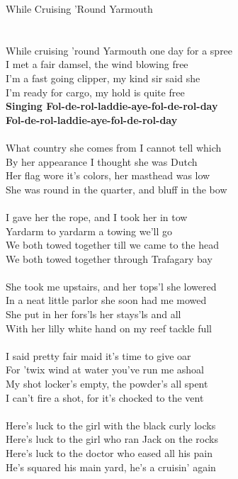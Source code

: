\documentclass[letterpaper,9pt]{article}
\begin{document}
\newpage
{}
\huge
While Cruising 'Round Yarmouth\\
\\
\Large
\\While cruising 'round Yarmouth one day for a spree
\\I met a fair damsel, the wind blowing free
\\I'm a fast going clipper, my kind sir said she
\\I'm ready for cargo, my hold is quite free
\\\textbf{Singing Fol-de-rol-laddie-aye-fol-de-rol-day
\\Fol-de-rol-laddie-aye-fol-de-rol-day}
\\
\\What country she comes from I cannot tell which
\\By her appearance I thought she was Dutch
\\Her flag wore it's colors, her masthead was low
\\She was round in the quarter, and bluff in the bow
\\
\\I gave her the rope, and I took her in tow
\\Yardarm to yardarm a towing we'll go
\\We both towed together till we came to the head
\\We both towed together through Trafagary bay
\\
\\She took me upstairs, and her tops'l she lowered
\\In a neat little parlor she soon had me mowed
\\She put in her fors'ls her stays'ls and all
\\With her lilly white hand on my reef tackle full
\\
\\I said pretty fair maid it's time to give oar
\\For 'twix wind at water you've run me ashoal
\\My shot locker's empty, the powder's all spent
\\I can't fire a shot, for it's chocked to the vent
\\
\\Here's luck to the girl with the black curly locks
\\Here's luck to the girl who ran Jack on the rocks
\\Here's luck to the doctor who eased all his pain
\\He's squared his main yard, he's a cruisin' again
\end{document}

